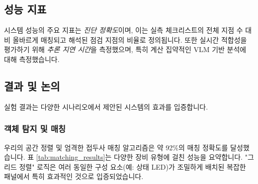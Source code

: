 \subsection{성능 지표}
시스템 성능의 주요 지표는 \textit{진단 정확도}이며, 이는 실측 체크리스트의 전체 지점 수 대비 올바르게 매칭되고 해석된 점검 지점의 비율로 정의됩니다.
또한 실시간 적합성을 평가하기 위해 \textit{추론 지연 시간}을 측정했으며, 특히 계산 집약적인 VLM 기반 분석에 대해 측정했습니다.

\subsection{결과 및 논의}
실험 결과는 다양한 시나리오에서 제안된 시스템의 효과를 입증합니다.

\subsubsection{객체 탐지 및 매칭}
우리의 공간 정렬 및 엄격한 접두사 매칭 알고리즘은 약 92\%의 매칭 정확도를 달성했습니다.
표 \ref{tab:matching_results}는 다양한 장비 유형에 걸친 성능을 요약합니다.
"그리드 정렬" 로직은 여러 동일한 구성 요소(예: 상태 LED)가 조밀하게 배치된 복잡한 패널에서 특히 효과적인 것으로 입증되었습니다.

